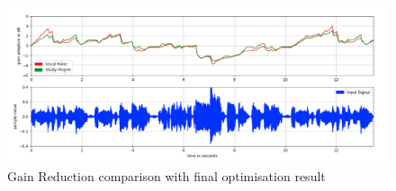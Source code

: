 \begin{figure}
\includegraphics[width=\textwidth]{images/compareResult}
\caption{Gain Reduction comparison with final optimisation result}
\label{fresult}
\end{figure}